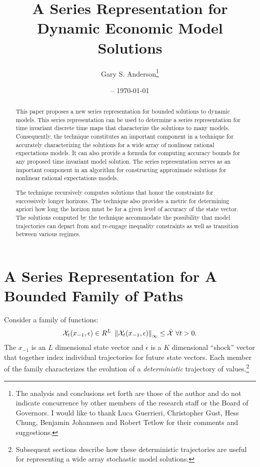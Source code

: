 \documentclass[12pt]{article}
\title{A Series Representation for Dynamic Economic Model Solutions}
\date{\currenttime -- \today }
\author{Gary S. Anderson\thanks{The analysis and conclusions set forth are those of the author and do not indicate concurrence by other members of the research staff or the Board of Governors. I would like to thank Luca Guerrieri, Christopher Gust, Hess Chung, Benjamin Johannsen  and Robert Tetlow for their comments and suggestions. }}
\begin{document}
\maketitle

\begin{abstract}


 
This paper proposes a new series representation for bounded
solutions to dynamic models. 
This series representation can be used to
determine a series representation for 
time invariant discrete time maps that characterize the solutions
to many models.  Consequently, the technique constitutes an important component
in a technique for accurately characterizing the solutions for a 
wide array of nonlinear rational expectations models.
It can also  provide a formula
for computing accuracy bounds for any proposed time invariant model solution.
The series representation serves as an important component in an algorithm 
for constructing approximate solutions for nonlinear rational expectations
models.




  The technique recursively computes  solutions that honor the constraints for successively longer horizons. The technique also provides a metric for determining apriori how long the horizon must be for a given level of accuracy of the
state vector. The solutions computed by the technique accommodate the possibility that model trajectories can depart from and re-engage inequality constraints as well as transition between various regimes.
  



\end{abstract}

 \newpage
 \tableofcontents
 \newpage






\section{A Series Representation for A Bounded Family of Paths}
\label{sec:seri-repr-bound}

Consider a family of functions:
 \begin{gather}
   \mathcal{X}_{t}(x_{-1},\epsilon) \in{R^L}\,\,\left\lVert\mathcal{X}_{t}(x_{-1},\epsilon)\right\rVert_\infty  \le \bar{\mathcal{X}}\,\,\forall t> 0 \label{fFamily}.
 \end{gather}
The $x_{-1}$ is an  $L$ dimensional state vector and $\epsilon$ is a $K$ dimensional ``shock'' vector that together index
individual trajectories for future state vectors.  
Each member of the family characterizes the evolution of a {\em deterministic} trajectory of values.\footnote{Subsequent sections describe how these deterministic trajectories are useful for representing a wide array stochastic model solutions.}
\end{document}
